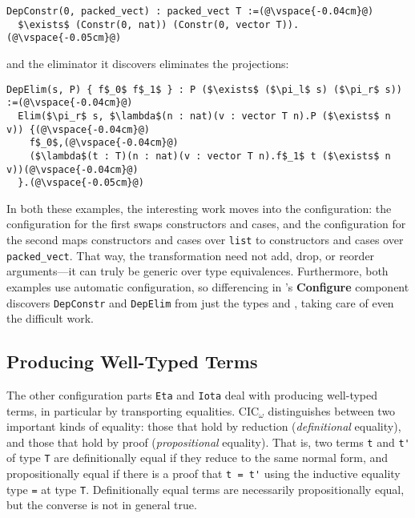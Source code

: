\begin{lstlisting}
DepConstr(0, packed_vect) : packed_vect T :=(@\vspace{-0.04cm}@)
  $\exists$ (Constr(0, nat)) (Constr(0, vector T)).(@\vspace{-0.05cm}@)
\end{lstlisting}
and the eliminator it discovers eliminates the projections:

\begin{lstlisting}
DepElim(s, P) { f$_0$ f$_1$ } : P ($\exists$ ($\pi_l$ s) ($\pi_r$ s)) :=(@\vspace{-0.04cm}@)
  Elim($\pi_r$ s, $\lambda$(n : nat)(v : vector T n).P ($\exists$ n v)) {(@\vspace{-0.04cm}@)
    f$_0$,(@\vspace{-0.04cm}@)
    ($\lambda$(t : T)(n : nat)(v : vector T n).f$_1$ t ($\exists$ n v))(@\vspace{-0.04cm}@)
  }.(@\vspace{-0.05cm}@) 
\end{lstlisting}

In both these examples, the interesting work moves into the configuration:
the configuration for the first swaps constructors and cases,
and the configuration for the second maps constructors and cases over \lstinline{list} to constructors and cases over \lstinline{packed_vect}. %
That way, the transformation need not add, drop, or reorder arguments---it can truly be generic over type equivalences.
Furthermore, both examples use automatic configuration, so differencing in \toolnamec's \textbf{Configure} component
discovers \lstinline{DepConstr} and \lstinline{DepElim} from just the types \Aa and \B, taking care of even the difficult work.

\subsection{Producing Well-Typed Terms}
\label{sec:pi-diff-equal}

The other configuration parts \lstinline{Eta} and \lstinline{Iota} deal with producing well-typed terms,
in particular by transporting equalities.
CIC$_{\omega}$ distinguishes between two important kinds of equality: those that hold by reduction (\textit{definitional} equality), and those that hold by proof (\textit{propositional} equality).
That is, two terms \lstinline{t} and \lstinline{t'} of type \lstinline{T} are definitionally equal if they reduce to the same normal form,
and propositionally equal if there is a proof that \lstinline{t = t'} using the inductive
equality type \lstinline{=} at type \lstinline{T}. Definitionally equal terms are necessarily propositionally equal, but 
the converse is not in general true. %

